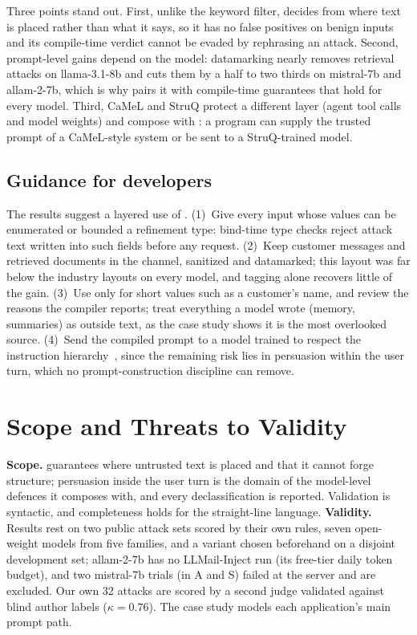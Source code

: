 \documentclass[conference]{IEEEtran}
\begin{document}
Three points stand out. First, unlike the keyword filter, \TL{} decides from where text is placed rather than what it says, so it has no false positives on benign inputs and its compile-time verdict cannot be evaded by rephrasing an attack. Second, prompt-level gains depend on the model: datamarking nearly removes retrieval attacks on llama-3.1-8b and cuts them by a half to two thirds on mistral-7b and allam-2-7b, which is why \TL{} pairs it with compile-time guarantees that hold for every model. Third, CaMeL and StruQ protect a different layer (agent tool calls and model weights) and compose with \TL{}: a \TL{} program can supply the trusted prompt of a CaMeL-style system or be sent to a StruQ-trained model.

\subsection{Guidance for developers}
The results suggest a layered use of \TL{}. (1)~Give every input whose values can be enumerated or bounded a refinement type: bind-time type checks reject attack text written into such fields before any request. (2)~Keep customer messages and retrieved documents in the  channel, sanitized and datamarked; this layout was far below the industry layouts on every model, and tagging alone recovers little of the gain. (3)~Use  only for short values such as a customer's name, and review the reasons the compiler reports; treat everything a model wrote (memory, summaries) as outside text, as the case study shows it is the most overlooked source. (4)~Send the compiled prompt to a model trained to respect the instruction hierarchy~\cite{wallace2024hierarchy}, since the remaining risk lies in persuasion within the user turn, which no prompt-construction discipline can remove.

\section{Scope and Threats to Validity}

\textbf{Scope.} \TL{} guarantees where untrusted text is placed and that it cannot forge structure; persuasion inside the user turn is the domain of the model-level defences it composes with, and every declassification is reported. Validation is syntactic, and completeness holds for the straight-line language. \textbf{Validity.} Results rest on two public attack sets scored by their own rules, seven open-weight models from five families, and a variant chosen beforehand on a disjoint development set; allam-2-7b has no LLMail-Inject run (its free-tier daily token budget), and two mistral-7b trials (in A and S) failed at the server and are excluded. Our own 32 attacks are scored by a second judge validated against blind author labels ($\kappa=0.76$). The case study models each application's main prompt path.
\end{document}
